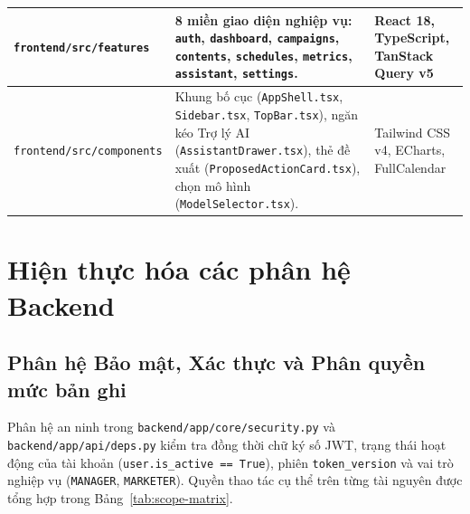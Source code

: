 \begin{table}[!htbp]
\begin{tabularx}{\textwidth}{|L{4.2cm}|Y|L{3.1cm}|}
\hline
\texttt{frontend/src/features} & 8 miền giao diện nghiệp vụ: \texttt{auth}, \texttt{dashboard}, \texttt{campaigns}, \texttt{contents}, \texttt{schedules}, \texttt{metrics}, \texttt{assistant}, \texttt{settings}. & React 18, TypeScript, TanStack Query v5\\
\hline
\texttt{frontend/src/components} & Khung bố cục (\texttt{AppShell.tsx}, \texttt{Sidebar.tsx}, \texttt{TopBar.tsx}), ngăn kéo Trợ lý AI (\texttt{AssistantDrawer.tsx}), thẻ đề xuất (\texttt{ProposedActionCard.tsx}), chọn mô hình (\texttt{ModelSelector.tsx}). & Tailwind CSS v4, ECharts, FullCalendar\\
\hline
\end{tabularx}
\end{table}

\section{Hiện thực hóa các phân hệ Backend}

\subsection{Phân hệ Bảo mật, Xác thực và Phân quyền mức bản ghi}

Phân hệ an ninh trong \texttt{backend/app/core/security.py} và \texttt{backend/app/api/deps.py} kiểm tra đồng thời chữ ký số JWT, trạng thái hoạt động của tài khoản (\texttt{user.is\_active == True}), phiên \texttt{token\_version} và vai trò nghiệp vụ (\texttt{MANAGER}, \texttt{MARKETER}). Quyền thao tác cụ thể trên từng tài nguyên được tổng hợp trong Bảng~\ref{tab:scope-matrix}.

